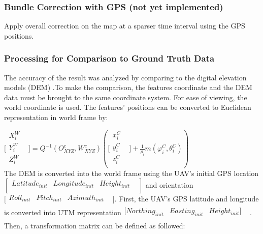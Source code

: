 \subsubsection{Bundle Correction with GPS (not yet 
implemented)}\label{section:_Toc332876138}
Apply overall correction on the map at a sparser time interval using the 
GPS positions. 

\subsubsection{Processing for Comparison to Ground Truth Data}
The accuracy of the result was analyzed by comparing to the digital 
elevation models (DEM) .To make the comparison, the features coordinate 
and the DEM data must be brought to the same coordinate system. For ease 
of viewing, the world coordinate is used. The features' positions can be 
converted to Euclidean representation in world frame by: 

$\lbrack \begin{matrix}
X_{i}^{W} & \\
Y_{i}^{W} & \\
Z_{i}^{W} & \\
\end{matrix}
\rbrack =Q^{-1}(O_{XYZ}^{c}, W_{XYZ}^{c})(\lbrack \begin{matrix}
x_{i}^{C} & \\
y_{i}^{C} & \\
z_{i}^{C} & \\
\end{matrix}
\rbrack +\frac{1}{\rho _{i}}m(\varphi _{i}^{C}, \theta _{i}^{C}))$\\


The DEM is converted into the world frame using the UAV's initial GPS 
location$[\begin{matrix}
Latitude_{init} & Longitude_{init} & Height_{init} & \\
\end{matrix}
]$ and orientation$\lbrack \begin{matrix}
Roll_{init} & Pitch_{init } & Azimuth_{init} & \\
\end{matrix}
\rbrack $. First, the UAV's GPS latitude and longitude is converted 
into UTM representation$\begin{matrix}
[Northing_{init} & Easting_{init} & Height_{init}] & \\
\end{matrix}
$. Then, a transformation matrix can be defined as followed:

